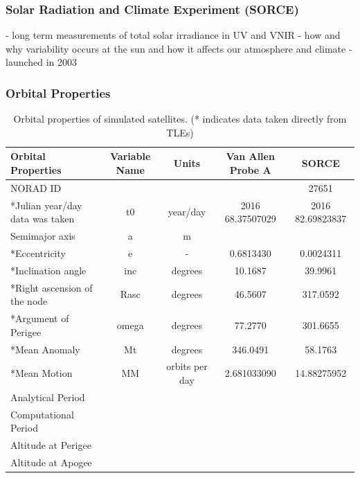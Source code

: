 \documentclass[Space3_Assign1.tex]{subfiles}
\begin{document}
\subsubsection{Solar Radiation and Climate Experiment (SORCE)}
- long term measurements of total solar irradiance in UV and VNIR
- how and why variability occurs at the sun and how it affects our atmosphere and climate
- launched in 2003
\subsubsection{Orbital Properties}
\begin{table}[h]
\centering
\caption{Orbital properties of simulated satellites. (* indicates data taken directly from TLEs)}
\label{Q1.orbitprop}
\begin{tabular}{|l|c|c|c|c|}
	\hline
	Orbital Properties              & Variable Name &     Units      & Van Allen Probe A &     SORCE      \\ \hline
	NORAD ID                        &               &                &                   &      27651       \\ \hline
	*Julian year/day data was taken &      t0       &    year/day    & 2016 68.37507029  & 2016 82.69823837 \\ \hline
	Semimajor axis                  &       a       &       m        &                   &  \\ \hline
	*Eccentricity                   &       e       &       -        &     0.6813430     &    0.0024311     \\ \hline
	*Inclination angle              &      inc      &    degrees     &      10.1687      &      39.9961      \\ \hline
	*Right ascension of the node    &     Rasc      &    degrees     &      46.5607      &     317.0592     \\ \hline
	*Argument of Perigee            &     omega     &    degrees     &      77.2770      &     301.6655     \\ \hline
	*Mean Anomaly                   &      Mt       &    degrees     &     346.0491      &     58.1763      \\\hline
	*Mean Motion             &      MM       & orbits per day &    2.681033090    &     14.88275952      \\ \hline
	Analytical Period               &               &                &                   &  \\ \hline
	Computational Period            &               &                &                   &  \\ \hline
	Altitude at Perigee             &               &                &                   &  \\ \hline
	Altitude at Apogee              &               &                &                   &  \\ \hline
\end{tabular}
\end{table}

\end{document}
